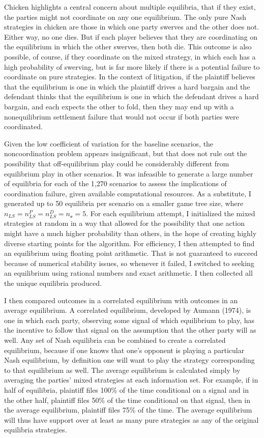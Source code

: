 \documentclass{article}
\begin{document}
Chicken highlights a central concern about multiple equilibria, that if they exist, the parties might not coordinate on any one equilibrium. The only pure Nash strategies in chicken are those in which one party swerves and the other does not. Either way, no one dies. But if each player believes that they are coordinating on the equilibrium in which the other swerves, then both die. This outcome is also possible, of course, if they coordinate on the mixed strategy, in which each has a high probability of swerving, but is far more likely if there is a potential failure to coordinate on pure strategies. In the context of litigation, if the plaintiff believes that the equilibrium is one in which the plaintiff drives a hard bargain and the defendant thinks that the equilibrium is one in which the defendant drives a hard bargain, and each expects the other to fold, then they may end up with a nonequilibrium settlement failure that would not occur if both parties were coordinated.

Given the low coefficient of variation for the baseline scenarios, the noncoordination problem appears insignificant, but that does not rule out the possibility that off-equilibrium play could be considerably different from equilibrium play in other scenarios.  It was infeasible to generate a large number of equilibria for each of the 1,270 scenarios to assess the implications of coordination failure, given available computational resources. As a substitute, I generated up to 50 equilibria per scenario on a smaller game tree size, where $n_{LS}=n_{LS}^P=n_{LS}^D=n_{\mathcal{o}}=5$. For each equilibrium attempt, I initialized the mixed strategies at random in a way that allowed for the possibility that one action might have a much higher probability than others, in the hope of creating highly diverse starting points for the algorithm. For efficiency, I then attempted to find an equilibrium using floating point arithmetic. That is not guaranteed to succeed because of numerical stability issues, so whenever it failed, I switched to seeking an equilibrium using rational numbers and exact arithmetic. I then collected all the unique equilibria produced. 

I then compared outcomes in a correlated equilibrium with outcomes in an average equilibrium. A correlated equilibrium, developed by Aumann (1974), is one in which each party, observing some signal of which equilibrium to play, has the incentive to follow that signal on the assumption that the other party will as well. Any set of Nash equilibria can be combined to create a correlated equilibrium, because if one knows that one's opponent is playing a particular Nash equilibrium, by definition one will want to play the strategy corresponding to that equilibrium as well. The average equilibrium is calculated simply by averaging the parties' mixed strategies at each information set. For example, if in half of equilibria, plaintiff files 100\% of the time conditional on a signal and in the other half, plaintiff files 50\% of the time conditional on that signal, then in the average equilibrium, plaintiff files 75\% of the time. The average equilibrium will thus have support over at least as many pure strategies as any of the original equilibria strategies. 
\end{document}
